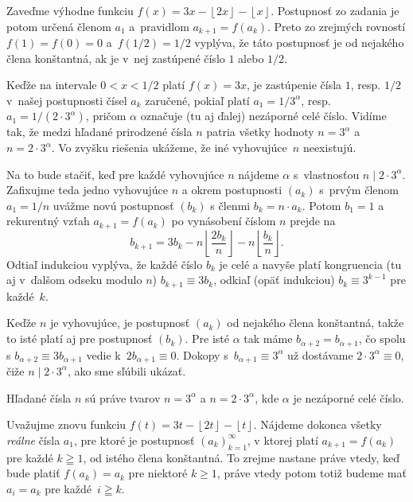 {%
\def\ent#1{\left\lfloor #1\right\rfloor}%
Zaveďme výhodne funkciu $f(x)=3x-\ent{2x}-\ent{x}$.
Postupnosť zo zadania je potom určená členom $a_1$
a~pravidlom $a_{k+1} = f(a_k)$.
Preto zo zrejmých rovností $f(1)=f(0)=0$ a~$f(1/2) = 1/2$
vyplýva, že táto postupnosť je od nejakého člena konštantná,
ak je v~nej zastúpené číslo $1$ alebo $1/2$.

Keďže na intervale $0<x<1/2$ platí $f(x) = 3x$,
je zastúpenie čísla $1$, resp. $1/2$ v~našej postupnosti
čísel $a_k$ zaručené, pokiaľ platí $a_1=1/3^\alpha$,
resp. $a_1=1/(2\cdot 3^\alpha)$, pričom $\alpha$ označuje (tu aj ďalej)
nezáporné celé číslo. Vidíme tak, že medzi hľadané prirodzené čísla $n$
patria všetky hodnoty $n=3^\alpha$ a $n=2\cdot 3^\alpha$.
Vo zvyšku riešenia ukážeme, že iné vyhovujúce~$n$ neexistujú.

Na to bude stačiť, keď pre každé vyhovujúce $n$ nájdeme $\alpha$
s~vlastnosťou $n\mid 2\cdot 3^\alpha$. Zafixujme teda jedno
vyhovujúce $n$ a okrem postupnosti $(a_k)$ s~prvým členom $a_1=1/n$
uvážme novú postupnosť $(b_k)$ s členmi $b_k=n\cdot a_k$.
Potom $b_1=1$ a rekurentný vzťah $a_{k+1}=f(a_k)$ po
vynásobení číslom $n$ prejde
na
$$
b_{k+1}=3b_k-n\ent{\frac{2b_k}{n}}-n\ent{\frac{b_k}{n}}.
$$
Odtiaľ indukciou vyplýva, že každé číslo $b_k$ je celé a navyše
platí kongruencia (tu aj v~ďalšom odseku modulo $n$)
$b_{k+1}\equiv 3b_k$, odkiaľ (opäť indukciou) $b_{k}\equiv3^{k-1}$
pre každé~$k$.

Keďže $n$ je vyhovujúce, je postupnosť $(a_k)$
od nejakého člena konštantná, takže to isté platí
aj pre postupnosť $(b_k)$. Pre isté $\alpha$ tak máme
$b_{\alpha+2}=b_{\alpha+1}$, čo spolu s $b_{\alpha+2}\equiv 3b_{\alpha+1}$ vedie
k~$2b_{\alpha+1}\equiv0$. Dokopy s~$b_{\alpha+1}\equiv3^{\alpha}$ už
dostávame $2\cdot3^{\alpha}\equiv0$, čiže $n\mid2\cdot3^{\alpha}$, ako
sme sľúbili ukázať.

\zaver
Hľadané čísla $n$ sú práve tvarov $n=3^\alpha$ a
$n=2\cdot 3^\alpha$, kde $\alpha$ je nezáporné celé číslo.

\def\zl#1{\left\{#1\right\}}
\def\ce#1{\left\lfloor#1\right\rfloor}
\def\Ekv{\Leftrightarrow}
\ineriesenie
Uvažujme znovu funkciu $f(t)=3t-\ce{2t}-\ce{t}$. Nájdeme dokonca všetky
\emph{reálne} čísla $a_1$, pre ktoré je postupnosť
$(a_k)_{k=1}^{\infty}$, v ktorej platí
$a_{k+1}=f(a_k)$ pre každé $k\geqq1$, od istého člena konštantná.
To zrejme nastane práve vtedy, keď bude platiť $f(a_k)=a_k$ pre niektoré
$k\geq1$, práve vtedy potom totiž budeme mať
$a_i=a_k$ pre každé~$i\geqq k$.

}
